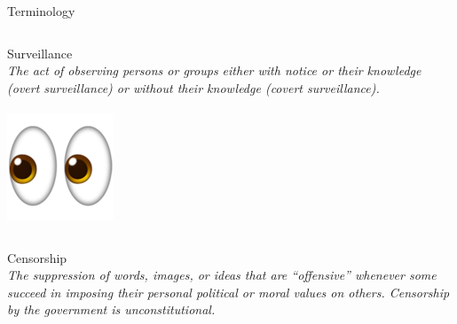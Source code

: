\documentclass[nobackground,dvipsnames,table]{beamer}
\begin{document}
\begin{frame}{Terminology}
    \begin{columns}[T]
            Surveillance\\
            \small{\textit{The act of observing persons or groups either with notice or their knowledge (overt surveillance) or without their knowledge (covert surveillance).}}\\~\\
            \includegraphics[width=\textwidth]{eyes}
    \end{columns}
    \vspace{0.05\textheight}
    \begin{columns}[T]
            Censorship\\
            \small{\textit{The suppression of words, images, or ideas that are “offensive” whenever some succeed in imposing their personal political or moral values on others. Censorship by the government is unconstitutional.}}\\~\\
        

\end{columns}
\end{frame}
\end{document}
